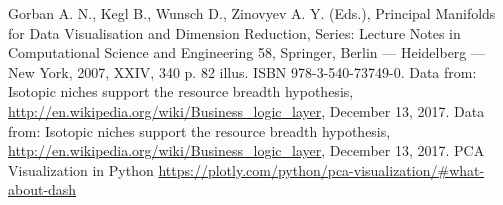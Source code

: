 \documentclass[main.tex]{subfiles}
\begin{document}
	\begin{thebibliography}{99}
		Gorban A. N., Kegl B., Wunsch D., Zinovyev A. Y. (Eds.), Principal Manifolds for Data Visualisation and Dimension Reduction, Series: Lecture Notes in Computational Science and Engineering 58, Springer, Berlin — Heidelberg — New York, 2007, XXIV, 340 p. 82 illus. ISBN 978-3-540-73749-0.
		Data from: Isotopic niches support the resource breadth hypothesis, \url{http://en.wikipedia.org/wiki/Business_logic_layer}, December 13, 2017.
		Data from: Isotopic niches support the resource breadth hypothesis, \url{http://en.wikipedia.org/wiki/Business_logic_layer}, December 13, 2017.
		PCA Visualization in Python
		\url{https://plotly.com/python/pca-visualization/#what-about-dash}
	\end{thebibliography}
\end{document}
